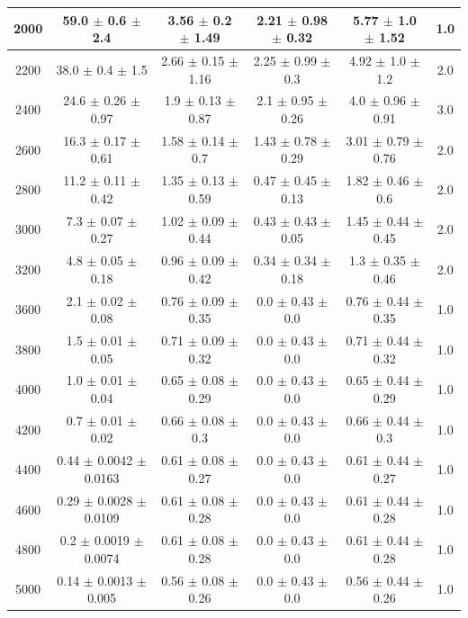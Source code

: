 \begin{table}[htp]
{\begin{tabular}{|c|c|c|c|c|c|}
			2000 & 59.0 $\pm$ 0.6 $\pm$ 2.4 & 3.56 $\pm$ 0.2 $\pm$ 1.49 & 2.21 $\pm$ 0.98 $\pm$ 0.32 & 5.77 $\pm$ 1.0 $\pm$ 1.52 & 1.0     \\ \hline
			2200 & 38.0 $\pm$ 0.4 $\pm$ 1.5 & 2.66 $\pm$ 0.15 $\pm$ 1.16 & 2.25 $\pm$ 0.99 $\pm$ 0.3 & 4.92 $\pm$ 1.0 $\pm$ 1.2 & 2.0     \\ \hline
			2400 & 24.6 $\pm$ 0.26 $\pm$ 0.97 & 1.9 $\pm$ 0.13 $\pm$ 0.87 & 2.1 $\pm$ 0.95 $\pm$ 0.26 & 4.0 $\pm$ 0.96 $\pm$ 0.91 & 3.0     \\ \hline
			2600 & 16.3 $\pm$ 0.17 $\pm$ 0.61 & 1.58 $\pm$ 0.14 $\pm$ 0.7 & 1.43 $\pm$ 0.78 $\pm$ 0.29 & 3.01 $\pm$ 0.79 $\pm$ 0.76 & 2.0     \\ \hline
			2800 & 11.2 $\pm$ 0.11 $\pm$ 0.42 & 1.35 $\pm$ 0.13 $\pm$ 0.59 & 0.47 $\pm$ 0.45 $\pm$ 0.13 & 1.82 $\pm$ 0.46 $\pm$ 0.6 & 2.0     \\ \hline
			3000 & 7.3 $\pm$ 0.07 $\pm$ 0.27 & 1.02 $\pm$ 0.09 $\pm$ 0.44 & 0.43 $\pm$ 0.43 $\pm$ 0.05 & 1.45 $\pm$ 0.44 $\pm$ 0.45 & 2.0     \\ \hline
			3200 & 4.8 $\pm$ 0.05 $\pm$ 0.18 & 0.96 $\pm$ 0.09 $\pm$ 0.42 & 0.34 $\pm$ 0.34 $\pm$ 0.18 & 1.3 $\pm$ 0.35 $\pm$ 0.46 & 2.0     \\ \hline
			3600 & 2.1 $\pm$ 0.02 $\pm$ 0.08 & 0.76 $\pm$ 0.09 $\pm$ 0.35 & 0.0 $\pm$ 0.43 $\pm$ 0.0 & 0.76 $\pm$ 0.44 $\pm$ 0.35 & 1.0     \\ \hline
			3800 & 1.5 $\pm$ 0.01 $\pm$ 0.05 & 0.71 $\pm$ 0.09 $\pm$ 0.32 & 0.0 $\pm$ 0.43 $\pm$ 0.0 & 0.71 $\pm$ 0.44 $\pm$ 0.32 & 1.0     \\ \hline
			4000 & 1.0 $\pm$ 0.01 $\pm$ 0.04 & 0.65 $\pm$ 0.08 $\pm$ 0.29 & 0.0 $\pm$ 0.43 $\pm$ 0.0 & 0.65 $\pm$ 0.44 $\pm$ 0.29 & 1.0     \\ \hline
			4200 & 0.7 $\pm$ 0.01 $\pm$ 0.02 & 0.66 $\pm$ 0.08 $\pm$ 0.3 & 0.0 $\pm$ 0.43 $\pm$ 0.0 & 0.66 $\pm$ 0.44 $\pm$ 0.3 & 1.0     \\ \hline
			4400 & 0.44 $\pm$ 0.0042 $\pm$ 0.0163 & 0.61 $\pm$ 0.08 $\pm$ 0.27 & 0.0 $\pm$ 0.43 $\pm$ 0.0 & 0.61 $\pm$ 0.44 $\pm$ 0.27 & 1.0     \\ \hline
			4600 & 0.29 $\pm$ 0.0028 $\pm$ 0.0109 & 0.61 $\pm$ 0.08 $\pm$ 0.28 & 0.0 $\pm$ 0.43 $\pm$ 0.0 & 0.61 $\pm$ 0.44 $\pm$ 0.28 & 1.0     \\ \hline
			4800 & 0.2 $\pm$ 0.0019 $\pm$ 0.0074 & 0.61 $\pm$ 0.08 $\pm$ 0.28 & 0.0 $\pm$ 0.43 $\pm$ 0.0 & 0.61 $\pm$ 0.44 $\pm$ 0.28 & 1.0     \\ \hline
			5000 & 0.14 $\pm$ 0.0013 $\pm$ 0.005 & 0.56 $\pm$ 0.08 $\pm$ 0.26 & 0.0 $\pm$ 0.43 $\pm$ 0.0 & 0.56 $\pm$ 0.44 $\pm$ 0.26 & 1.0     \\ \hline

\end{tabular}}
\end{table}
